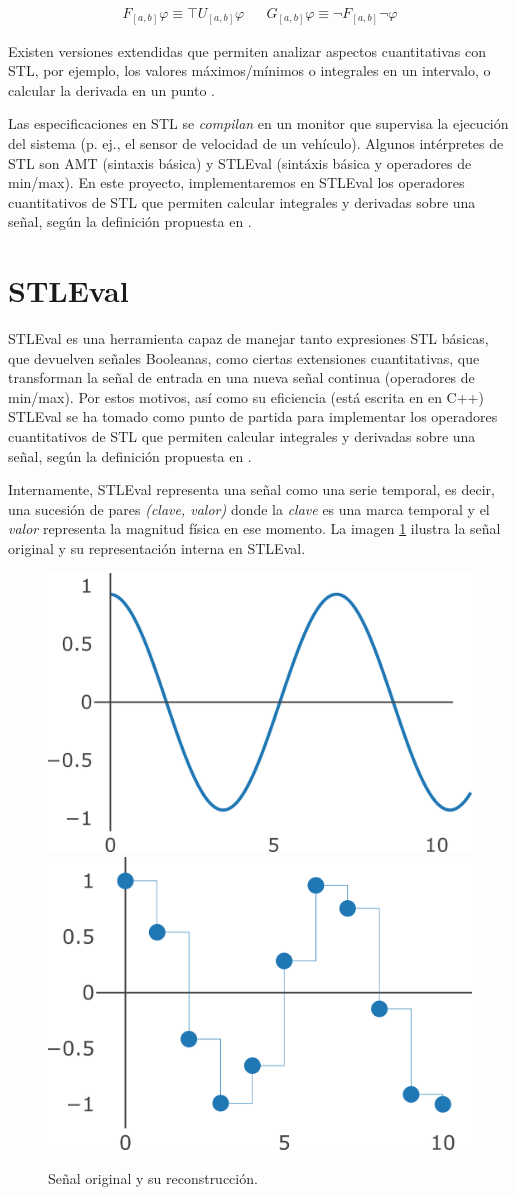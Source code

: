 \begin{align*}
F_{[a,b]} \varphi \equiv \top U_{[a,b]} \varphi & &
G_{[a,b]} \varphi \equiv \neg F_{[a,b]} \neg \varphi
\end{align*}

Existen versiones extendidas que permiten analizar aspectos cuantitativas con STL, por ejemplo, los valores máximos/mínimos \cite{TACAS_19} o integrales en un intervalo, o calcular la derivada en un punto \cite{Stl_Der_Int}.


Las especificaciones en STL se \textit{compilan} en un monitor que supervisa la ejecución del sistema (p. ej., el sensor de velocidad de un vehículo). Algunos intérpretes de STL son AMT \cite{AMT2} (sintaxis básica) y STLEval \cite{StlEval} (sintáxis básica y operadores de min/max). En este proyecto, implementaremos en STLEval los operadores cuantitativos de STL que permiten calcular integrales y derivadas sobre una señal, según la definición propuesta en \cite{Stl_Der_Int}.

\section{STLEval}
STLEval es una herramienta capaz de manejar tanto expresiones STL básicas, que devuelven señales Booleanas, como ciertas extensiones cuantitativas, que transforman la señal de entrada en una nueva señal continua (operadores de min/max). Por estos motivos, así como su eficiencia (está escrita en en C++) STLEval se ha tomado como punto de partida para implementar los operadores cuantitativos de STL que permiten calcular integrales y derivadas sobre una señal, según la definición propuesta en \cite{Stl_Der_Int}.

Internamente, STLEval representa una señal como una serie temporal, es decir, una sucesión de pares \textit{(clave, valor)} donde la \textit{clave} es una marca temporal y el \textit{valor} representa la magnitud física en ese momento. La imagen \ref{fig:senal} ilustra la señal original y su representación interna en STLEval. 

\begin{figure}
\centering
  \includegraphics[width=.4\linewidth]{images/senal_original} \hfill
  \includegraphics[width=.4\linewidth]{images/senal_muestreada}
\caption{Señal original y su reconstrucción.}
\label{fig:senal}
\end{figure}

